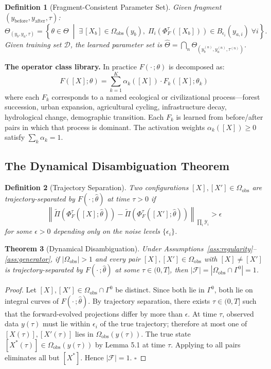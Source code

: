 \documentclass[12pt, oneside]{article}
\newtheorem{theorem}{Theorem}[section]
\newtheorem{definition}[theorem]{Definition}
\newcommand{\Ftil}{\widetilde{\Pi}}
\begin{document}
\begin{definition}[Fragment-Consistent Parameter Set]
Given fragment $(y_{\mathrm{before}}, y_{\mathrm{after}}, \tau)$:
\[
\Theta_{(y_b,y_a,\tau)} = \left\{ \theta \in \Theta \;\middle|\;
\exists\, [X_b] \in \Omega_{\mathrm{obs}}(y_b),\;
\Pi_i(\Phi^\tau_F([X_b])) \in B_{\epsilon_i}(y_{a,i})\; \forall i \right\}.
\]
Given training set $\mathcal{D}$, the learned parameter set is
$\hat{\Theta} = \bigcap_{n} \Theta_{(y_b^{(n)}, y_a^{(n)}, \tau^{(n)})}$.
\end{definition}

\textbf{The operator class library.} In practice $F(\cdot\,;\theta)$ is decomposed as:
\[
F([X];\theta) = \sum_{k=1}^K \alpha_k([X]) \cdot F_k([X];\theta_k)
\]
where each $F_k$ corresponds to a named ecological or civilizational process---forest
succession, urban expansion, agricultural cycling, infrastructure decay, hydrological
change, demographic transition. Each $F_k$ is learned from before/after pairs in which
that process is dominant. The activation weights $\alpha_k([X]) \ge 0$ satisfy
$\sum_k \alpha_k = 1$.

\subsection{The Dynamical Disambiguation Theorem}

\begin{definition}[Trajectory Separation]
Two configurations $[X],[X'] \in \Omega_{\mathrm{obs}}$ are \emph{trajectory-separated} by
$F(\cdot\,;\hat{\theta})$ at time $\tau > 0$ if
\[
\left\| \Ftil(\Phi^\tau_F([X];\hat{\theta})) - \Ftil(\Phi^\tau_F([X'];\hat{\theta}))
\right\|_{\prod_i \mathcal{Y}_i} > \epsilon
\]
for some $\epsilon > 0$ depending only on the noise levels $\{\epsilon_i\}$.
\end{definition}

\begin{theorem}[Dynamical Disambiguation]
\label{thm:disambiguation}
Under Assumptions~\ref{ass:regularity}--\ref{ass:generator}, if $|\Omega_{\mathrm{obs}}| > 1$
and every pair $[X],[X'] \in \Omega_{\mathrm{obs}}$ with $[X] \ne [X']$ is
trajectory-separated by $F(\cdot\,;\hat{\theta})$ at some $\tau \in (0,T]$, then
$|\mathcal{F}| = |\Omega_{\mathrm{obs}} \cap \Gamma^0| = 1$.
\end{theorem}

\begin{proof}
Let $[X],[X'] \in \Omega_{\mathrm{obs}} \cap \Gamma^0$ be distinct. Since both lie in
$\Gamma^0$, both lie on integral curves of $F(\cdot\,;\hat{\theta})$. By trajectory
separation, there exists $\tau \in (0,T]$ such that the forward-evolved projections differ
by more than $\epsilon$. At time $\tau$, observed data $y(\tau)$ must lie within $\epsilon_i$
of the true trajectory; therefore at most one of $[X(\tau)],[X'(\tau)]$ lies in
$\Omega_{\mathrm{obs}}(y(\tau))$. The true state $[X^*(\tau)] \in \Omega_{\mathrm{obs}}(y(\tau))$
by Lemma 5.1 at time $\tau$. Applying to all pairs eliminates all but $[X^*]$.
Hence $|\mathcal{F}| = 1$. $\square$
\end{proof}
\end{document}
